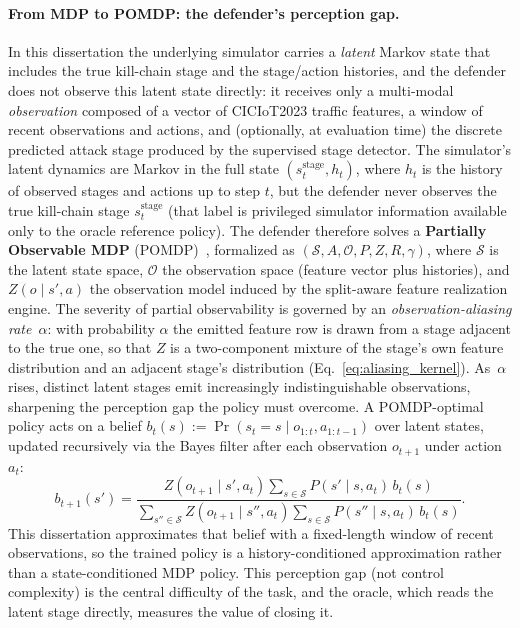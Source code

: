 \paragraph{From MDP to POMDP: the defender's perception gap.} In this dissertation the underlying simulator carries a \emph{latent} Markov state that includes the true kill-chain stage and the stage/action histories, and the defender does not observe this latent state directly: it receives only a multi-modal \emph{observation} composed of a vector of CICIoT2023 traffic features, a window of recent observations and actions, and (optionally, at evaluation time) the discrete predicted attack stage produced by the supervised stage detector. The simulator's latent dynamics are Markov in the full state $(s^{\text{stage}}_t, h_t)$, where $h_t$ is the history of observed stages and actions up to step $t$, but the defender never observes the true kill-chain stage $s^{\text{stage}}_t$ (that label is privileged simulator information available only to the oracle reference policy). The defender therefore solves a \textbf{Partially Observable MDP} (POMDP)~\cite{Sutton2018}, formalized as $(\mathcal{S}, A, \mathcal{O}, P, Z, R, \gamma)$, where $\mathcal{S}$ is the latent state space, $\mathcal{O}$ the observation space (feature vector plus histories), and $Z(o \mid s', a)$ the observation model induced by the split-aware feature realization engine. The severity of partial observability is governed by an \emph{observation-aliasing rate}~$\alpha$: with probability $\alpha$ the emitted feature row is drawn from a stage adjacent to the true one, so that $Z$ is a two-component mixture of the stage's own feature distribution and an adjacent stage's distribution (Eq.~\eqref{eq:aliasing_kernel}). As~$\alpha$ rises, distinct latent stages emit increasingly indistinguishable observations, sharpening the perception gap the policy must overcome. A POMDP-optimal policy acts on a belief $b_t(s) := \Pr(s_t = s \mid o_{1:t}, a_{1:t-1})$ over latent states, updated recursively via the Bayes filter after each observation $o_{t+1}$ under action $a_t$:
\begin{equation}\label{eq:belief_update_bg}
b_{t+1}(s') = \frac{Z(o_{t+1} \mid s', a_t) \sum_{s \in \mathcal{S}} P(s' \mid s, a_t)\, b_t(s)}{\sum_{s'' \in \mathcal{S}} Z(o_{t+1} \mid s'', a_t) \sum_{s \in \mathcal{S}} P(s'' \mid s, a_t)\, b_t(s)}.
\end{equation}
This dissertation approximates that belief with a fixed-length window of recent observations, so the trained policy is a history-conditioned approximation rather than a state-conditioned MDP policy. This perception gap (not control complexity) is the central difficulty of the task, and the oracle, which reads the latent stage directly, measures the value of closing it.


